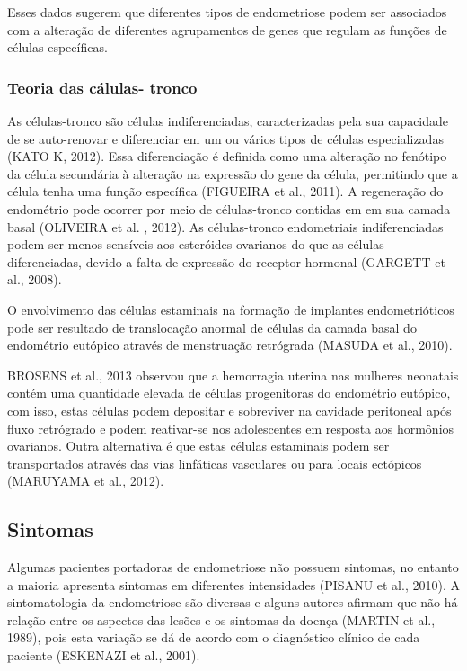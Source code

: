 \documentclass[12pt]{article} %
\begin{document}
Esses dados sugerem que diferentes tipos de endometriose podem ser associados com a alteração de diferentes agrupamentos de genes que regulam as funções de células específicas.

\subsubsection{Teoria das cálulas- tronco}

As células-tronco são células indiferenciadas, caracterizadas pela sua
capacidade de se auto-renovar e diferenciar em um ou vários tipos de
células especializadas (KATO K, 2012). Essa diferenciação é definida
como uma alteração no fenótipo da célula secundária à alteração na
expressão do gene da célula, permitindo que a célula tenha uma função
específica (FIGUEIRA et al., 2011). A regeneração do endométrio pode
ocorrer por meio de células-tronco contidas em em sua camada basal
(OLIVEIRA et al. , 2012). As células-tronco endometriais indiferenciadas podem ser menos sensíveis aos esteróides ovarianos do que as células diferenciadas, devido a falta de expressão do receptor hormonal (GARGETT et al., 2008).

O envolvimento das células estaminais na formação de implantes endometrióticos pode ser resultado de translocação anormal de células da camada basal do endométrio eutópico através de menstruação retrógrada (MASUDA et al., 2010).

BROSENS et al., 2013 observou que a hemorragia uterina nas mulheres neonatais contém uma quantidade elevada de células progenitoras do endométrio eutópico, com isso, estas células podem depositar e sobreviver na cavidade peritoneal após fluxo retrógrado e podem reativar-se nos adolescentes em resposta aos hormônios ovarianos. Outra alternativa é que estas células estaminais podem ser transportados através das vias linfáticas vasculares ou para locais ectópicos (MARUYAMA et al., 2012).

\subsection{Sintomas} 

Algumas pacientes portadoras de endometriose não possuem sintomas, no entanto a maioria apresenta sintomas
em diferentes intensidades (PISANU et al., 2010). A sintomatologia da endometriose são diversas e alguns autores afirmam que não há relação entre os aspectos das lesões e os sintomas da doença (MARTIN et al., 1989), pois esta variação se dá de acordo com o diagnóstico clínico de cada paciente (ESKENAZI et al., 2001).
\end{document}
